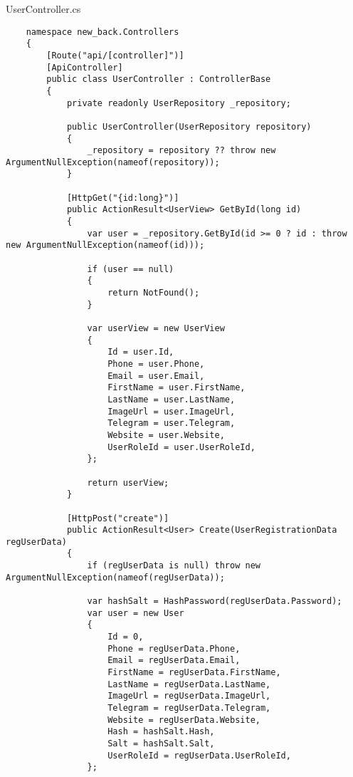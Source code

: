 UserController.cs
\lstset{style=sharpc}
\begin{lstlisting}
    namespace new_back.Controllers
    {
        [Route("api/[controller]")]
        [ApiController]
        public class UserController : ControllerBase
        {
            private readonly UserRepository _repository;
            
            public UserController(UserRepository repository)
            {
                _repository = repository ?? throw new ArgumentNullException(nameof(repository));
            }
            
            [HttpGet("{id:long}")]
            public ActionResult<UserView> GetById(long id)
            {
                var user = _repository.GetById(id >= 0 ? id : throw new ArgumentNullException(nameof(id)));
                
                if (user == null)
                {
                    return NotFound();
                }
                
                var userView = new UserView
                {
                    Id = user.Id,
                    Phone = user.Phone,
                    Email = user.Email,
                    FirstName = user.FirstName,
                    LastName = user.LastName,
                    ImageUrl = user.ImageUrl,
                    Telegram = user.Telegram,
                    Website = user.Website,
                    UserRoleId = user.UserRoleId,
                };
                
                return userView;
            }
            
            [HttpPost("create")]
            public ActionResult<User> Create(UserRegistrationData regUserData)
            {
                if (regUserData is null) throw new ArgumentNullException(nameof(regUserData));
    
                var hashSalt = HashPassword(regUserData.Password);
                var user = new User
                {
                    Id = 0,
                    Phone = regUserData.Phone,
                    Email = regUserData.Email,
                    FirstName = regUserData.FirstName,
                    LastName = regUserData.LastName,
                    ImageUrl = regUserData.ImageUrl,
                    Telegram = regUserData.Telegram,
                    Website = regUserData.Website,
                    Hash = hashSalt.Hash,
                    Salt = hashSalt.Salt,
                    UserRoleId = regUserData.UserRoleId,
                };
    

\end{lstlisting}
